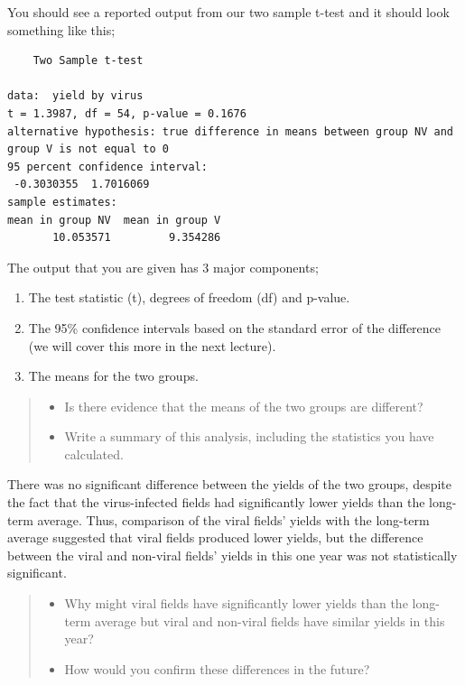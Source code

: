 \documentclass[
]{book}
\providecommand{\tightlist}{%
  \setlength{\itemsep}{0pt}\setlength{\parskip}{0pt}}
\begin{document}
You should see a reported output from our two sample t-test and it should look something like this;

\begin{verbatim}
    Two Sample t-test

data:  yield by virus
t = 1.3987, df = 54, p-value = 0.1676
alternative hypothesis: true difference in means between group NV and group V is not equal to 0
95 percent confidence interval:
 -0.3030355  1.7016069
sample estimates:
mean in group NV  mean in group V 
       10.053571         9.354286 
\end{verbatim}

The output that you are given has 3 major components;

\begin{enumerate}
\def\labelenumi{\arabic{enumi})}
\tightlist
\item
  The test statistic (t), degrees of freedom (df) and p-value.
\item
  The 95\% confidence intervals based on the standard error of the difference (we will cover this more in the next lecture).
\item
  The means for the two groups.
\end{enumerate}

\begin{quote}
\begin{itemize}
\tightlist
\item
  Is there evidence that the means of the two groups are different?
\item
  Write a summary of this analysis, including the statistics you have calculated.
\end{itemize}
\end{quote}

There was no significant difference between the yields of the two groups, despite the fact that the virus-infected fields had significantly lower yields than the long-term average. Thus, comparison of the viral fields' yields with the long-term average suggested that viral fields produced lower yields, but the difference between the viral and non-viral fields' yields in this one year was not statistically significant.

\begin{quote}
\begin{itemize}
\tightlist
\item
  Why might viral fields have significantly lower yields than the long-term average but viral and non-viral fields have similar yields in this year?
\item
  How would you confirm these differences in the future?
\end{itemize}
\end{quote}
\end{document}
